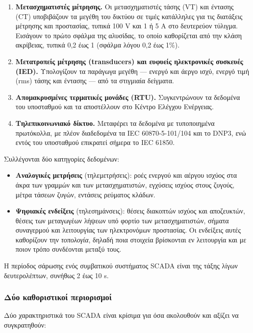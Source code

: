 \begin{enumerate}
\item \textbf{Μετασχηματιστές μέτρησης.} Οι μετασχηματιστές τάσης (VT) και έντασης (CT)
      υποβιβάζουν τα μεγέθη του δικτύου σε τιμές κατάλληλες για τις διατάξεις μέτρησης
      και προστασίας, τυπικά 100 V και 1 ή 5 A στο δευτερεύον τύλιγμα. Εισάγουν το πρώτο
      σφάλμα της αλυσίδας, το οποίο καθορίζεται από την κλάση ακρίβειας, τυπικά 0,2 έως 1
      (σφάλμα λόγου 0,2 έως 1\%).
\item \textbf{Μετατροπείς μέτρησης (transducers) και ευφυείς ηλεκτρονικές συσκευές (IED).}
      Υπολογίζουν τα παράγωγα μεγέθη — ενεργό και άεργο ισχύ, ενεργό τιμή (rms) τάσης και
      έντασης — από τα στιγμιαία δείγματα.
\item \textbf{Απομακρυσμένες τερματικές μονάδες (RTU).} Συγκεντρώνουν τα δεδομένα του
      υποσταθμού και τα αποστέλλουν στο Κέντρο Ελέγχου Ενέργειας.
\item \textbf{Τηλεπικοινωνιακό δίκτυο.} Μεταφέρει τα δεδομένα με τυποποιημένα πρωτόκολλα,
      με πλέον διαδεδομένα τα IEC 60870-5-101/104 και το DNP3, ενώ εντός του υποσταθμού
      επικρατεί σήμερα το IEC 61850.
\end{enumerate}

Συλλέγονται δύο κατηγορίες δεδομένων:

\begin{itemize}
\item \textbf{Αναλογικές μετρήσεις} (τηλεμετρήσεις): ροές ενεργού και αέργου ισχύος στα
      άκρα των γραμμών και των μετασχηματιστών, εγχύσεις ισχύος στους ζυγούς, μέτρα τάσεων
      ζυγών, εντάσεις ρεύματος κλάδων.
\item \textbf{Ψηφιακές ενδείξεις} (τηλεσημάνσεις): θέσεις διακοπτών ισχύος και αποζευκτών,
      θέσεις των μεταγωγέων λήψεων υπό φορτίο των μετασχηματιστών, σήματα συναγερμού και
      λειτουργίας των ηλεκτρονόμων προστασίας. Οι ενδείξεις αυτές
      καθορίζουν την \emph{τοπολογία}, δηλαδή ποια στοιχεία βρίσκονται εν λειτουργία και
      με ποιον τρόπο συνδέονται μεταξύ τους.
\end{itemize}

Η περίοδος σάρωσης ενός συμβατικού συστήματος SCADA είναι της τάξης λίγων δευτερολέπτων,
συνήθως 2 έως 10 s.

\subsubsection*{Δύο καθοριστικοί περιορισμοί}

Δύο χαρακτηριστικά του SCADA είναι κρίσιμα για όσα ακολουθούν και αξίζει να συγκρατηθούν:


